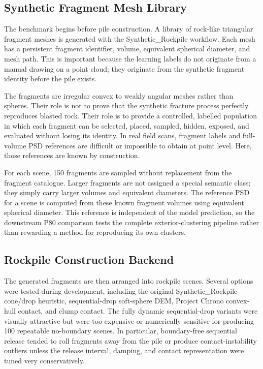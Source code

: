 \documentclass[11pt]{article}
\begin{document}
\subsection{Synthetic Fragment Mesh Library}
The benchmark begins before pile construction. A library of rock-like triangular fragment meshes is generated with the Synthetic\_Rockpile workflow. Each mesh has a persistent fragment identifier, volume, equivalent spherical diameter, and mesh path. This is important because the learning labels do not originate from a manual drawing on a point cloud; they originate from the synthetic fragment identity before the pile exists.

The fragments are irregular convex to weakly angular meshes rather than spheres. Their role is not to prove that the synthetic fracture process perfectly reproduces blasted rock. Their role is to provide a controlled, labelled population in which each fragment can be selected, placed, sampled, hidden, exposed, and evaluated without losing its identity. In real field scans, fragment labels and full-volume PSD references are difficult or impossible to obtain at point level. Here, those references are known by construction.

For each scene, 150 fragments are sampled without replacement from the fragment catalogue. Larger fragments are not assigned a special semantic class; they simply carry larger volumes and equivalent diameters. The reference PSD for a scene is computed from these known fragment volumes using equivalent spherical diameter. This reference is independent of the model prediction, so the downstream P80 comparison tests the complete exterior-clustering pipeline rather than rewarding a method for reproducing its own clusters.

\subsection{Rockpile Construction Backend}
The generated fragments are then arranged into rockpile scenes. Several options were tested during development, including the original Synthetic\_Rockpile cone/drop heuristic, sequential-drop soft-sphere DEM, Project Chrono convex-hull contact, and clump contact. The fully dynamic sequential-drop variants were visually attractive but were too expensive or numerically sensitive for producing 100 repeatable no-boundary scenes. In particular, boundary-free sequential release tended to roll fragments away from the pile or produce contact-instability outliers unless the release interval, damping, and contact representation were tuned very conservatively.
\end{document}

